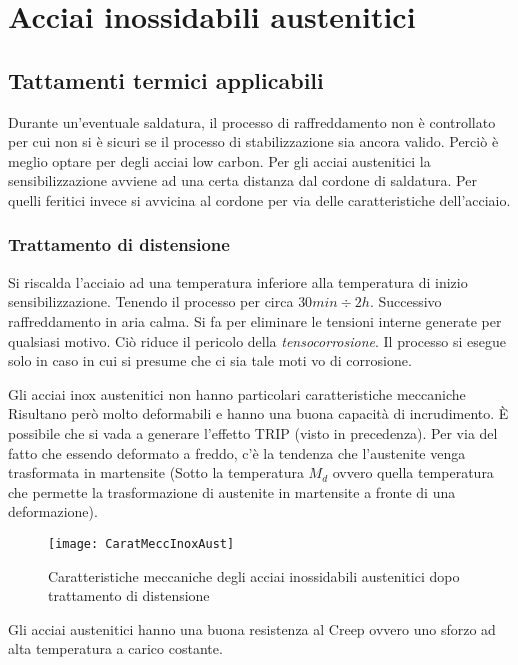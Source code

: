 \newpage
\section{Acciai inossidabili austenitici}
\subsection{Tattamenti termici applicabili}
Durante un'eventuale saldatura, il processo di raffreddamento non è 
controllato per cui non si è sicuri se il processo di stabilizzazione sia 
ancora valido. Perciò è meglio optare per degli acciai low carbon.
Per gli acciai austenitici la sensibilizzazione avviene ad una certa distanza 
dal cordone di saldatura. Per quelli feritici invece si avvicina al cordone
per via delle caratteristiche dell'acciaio.

\subsubsection{Trattamento di distensione}
Si riscalda l'acciaio ad una temperatura inferiore alla temperatura di inizio
sensibilizzazione. Tenendo il processo per circa $30min \div 2h$.
Successivo raffreddamento in aria calma. 
Si fa per eliminare le tensioni interne generate per qualsiasi motivo.
Ciò riduce il pericolo della \emph{tensocorrosione}.
Il processo si esegue solo in caso in cui si presume che ci sia tale moti vo di corrosione.

Gli acciai inox austenitici non hanno particolari caratteristiche meccaniche 
Risultano però molto deformabili e hanno una buona capacità di incrudimento.
È possibile che si vada a generare l'effetto \ac{TRIP} (visto in precedenza).
Per via del fatto che essendo deformato a freddo, c'è la tendenza che 
l'austenite venga trasformata in martensite (Sotto la temperatura $M_d$ 
ovvero quella temperatura che permette la trasformazione di austenite in
martensite a fronte di una deformazione).

\begin{figure}
\centering
\texttt{[image: CaratMeccInoxAust]}
\caption{Caratteristiche meccaniche degli acciai inossidabili austenitici dopo trattamento di distensione}
\label{fig:CaratMeccInoxAust}
\end{figure}

Gli acciai austenitici hanno una buona resistenza al Creep ovvero
uno sforzo ad alta temperatura a carico costante.

